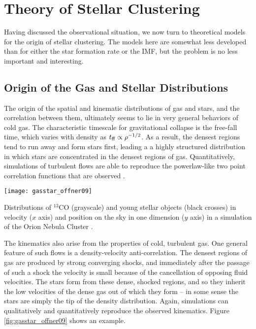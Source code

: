 \section{Theory of Stellar Clustering}

Having discussed the observational situation, we now turn to theoretical models for the origin of stellar clustering. The models here are somewhat less developed than for either the star formation rate or the IMF, but the problem is no less important and interesting.

\subsection{Origin of the Gas and Stellar Distributions}

The origin of the spatial and kinematic distributions of gas and stars, and the correlation between them, ultimately seems to lie in very general behaviors of cold gas. The characteristic timescale for gravitational collapse is the free-fall time, which varies with density as $t_{\rm ff} \propto \rho^{-1/2}$. As a result, the densest regions tend to run away and form stars first, leading a a highly structured distribution in which stars are concentrated in the densest regions of gas. Quantitatively, simulations of turbulent flows are able to reproduce the powerlaw-like two point correlation functions that are observed \citep{hansen12a}.

\begin{marginfigure}
\texttt{[image: gasstar\_offner09]}
\caption[Spatial and velocity distributions of gas and stars in a simulation]{
\label{fig:gasstar_offner09}
Distributions of $^{13}$CO (grayscale) and young stellar objects (black crosses) in velocity ($x$ axis) and position on the sky in one dimension ($y$ axis) in a simulation of the Orion Nebula Cluster \citep{offner09b}.
}
\end{marginfigure}

The kinematics also arise from the properties of cold, turbulent gas. One general feature of such flows is a density-velocity anti-correlation. The densest regions of gas are produced by strong converging shocks, and immediately after the passage of such a shock the velocity is small because of the cancellation of opposing fluid velocities. The stars form from these dense, shocked regions, and so they inherit the low velocities of the dense gas out of which they form -- in some sense the stars are simply the tip of the density distribution. Again, simulations can qualitatively and quantitatively reproduce the observed kinematics. Figure \ref{fig:gasstar_offner09} shows an example.

